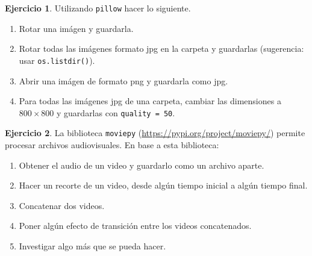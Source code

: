 \documentclass[a4paper,12pt]{book}
\theoremstyle{definition}
\newtheorem{ejercicio}{Ejercicio}
\begin{document}
	\begin{ejercicio}
		Utilizando {\tt pillow} hacer lo siguiente.
		\begin{enumerate}
			\item Rotar una imágen y guardarla.
			\item Rotar todas las imágenes formato jpg en la carpeta y guardarlas (sugerencia: usar {\tt os.listdir()}).
			\item Abrir una imágen de formato png y guardarla como jpg.
			\item Para todas las imágenes jpg de una carpeta, cambiar las dimensiones a $800\times 800$ y guardarlas con {\tt quality = 50}.
		\end{enumerate}
	\end{ejercicio}
	
	\begin{ejercicio}
		La biblioteca {\tt moviepy} (\href{https://pypi.org/project/moviepy/}{https://pypi.org/project/moviepy/}) permite procesar archivos audiovisuales. En base a esta biblioteca:
		\begin{enumerate}
			\item Obtener el audio de un video y guardarlo como un archivo aparte.
			\item Hacer un recorte de un video, desde algún tiempo inicial a algún tiempo final.
			\item Concatenar dos videos.
			\item Poner algún efecto de transición entre los videos concatenados.
			\item Investigar algo más que se pueda hacer.
		\end{enumerate}
	\end{ejercicio}
	
\end{document}
